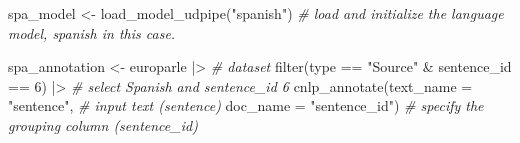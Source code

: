 \documentclass[
  letterpaper,
]{latex/krantz}
\newenvironment{Shaded}{\begin{snugshade}}{\end{snugshade}}
\newcommand{\AttributeTok}[1]{\textcolor[rgb]{0.00,0.00,0.00}{#1}}
\newcommand{\CommentTok}[1]{\textcolor[rgb]{0.00,0.00,0.00}{\textit{#1}}}
\newcommand{\DecValTok}[1]{\textcolor[rgb]{0.00,0.00,0.00}{#1}}
\newcommand{\FunctionTok}[1]{\textcolor[rgb]{0.00,0.00,0.00}{#1}}
\newcommand{\NormalTok}[1]{\textcolor[rgb]{0.00,0.00,0.00}{#1}}
\newcommand{\OtherTok}[1]{\textcolor[rgb]{0.00,0.00,0.00}{#1}}
\newcommand{\SpecialCharTok}[1]{\textcolor[rgb]{0.00,0.00,0.00}{#1}}
\newcommand{\StringTok}[1]{\textcolor[rgb]{0.00,0.00,0.00}{#1}}
\begin{document}
\begin{Shaded}
\begin{Highlighting}[]
\NormalTok{spa\_model }\OtherTok{\textless{}{-}} \FunctionTok{load\_model\_udpipe}\NormalTok{(}\StringTok{"spanish"}\NormalTok{) }\CommentTok{\# load and initialize the language model, \textquotesingle{}spanish\textquotesingle{} in this case.}

\NormalTok{spa\_annotation }\OtherTok{\textless{}{-}} 
\NormalTok{  europarle }\SpecialCharTok{|\textgreater{}} \CommentTok{\# dataset }
  \FunctionTok{filter}\NormalTok{(type }\SpecialCharTok{==} \StringTok{"Source"} \SpecialCharTok{\&}\NormalTok{ sentence\_id }\SpecialCharTok{==} \DecValTok{6}\NormalTok{) }\SpecialCharTok{|\textgreater{}} \CommentTok{\# select Spanish and sentence\_id 6}
  \FunctionTok{cnlp\_annotate}\NormalTok{(}\AttributeTok{text\_name =} \StringTok{"sentence"}\NormalTok{, }\CommentTok{\# input text (sentence)}
                \AttributeTok{doc\_name =} \StringTok{"sentence\_id"}\NormalTok{) }\CommentTok{\# specify the grouping column (sentence\_id)}
\end{Highlighting}
\end{Shaded}
\end{document}
